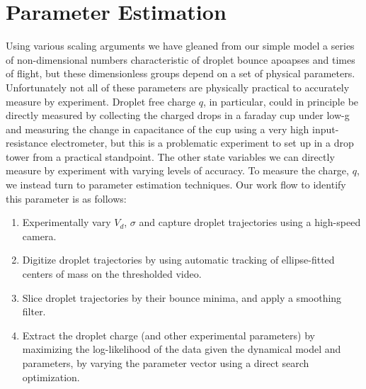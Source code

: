 \documentclass[12pt,a4paper,oneside]{book}
\begin{document}
\section{Parameter Estimation}
Using various scaling arguments we have gleaned from our simple model a series of non-dimensional numbers characteristic of droplet bounce apoapses and times of flight, but these dimensionless groups depend on a set of physical parameters. Unfortunately not all of these parameters are physically practical to accurately measure by experiment. Droplet free charge $q$, in particular, could in principle be directly measured by collecting the charged drops in a faraday cup under low-g and measuring the change in capacitance of the cup using a very high input-resistance electrometer, but this is a problematic experiment to set up in a drop tower from a practical standpoint. The other state variables we can directly measure by experiment with varying levels of accuracy. To measure the charge, $q$, we instead turn to parameter estimation techniques. Our work flow to identify this parameter is as follows:
\begin{enumerate}
\item Experimentally vary $V_d$, $\sigma$ and capture droplet trajectories using a high-speed camera.
\item Digitize droplet trajectories by using automatic tracking of ellipse-fitted centers of mass on the thresholded video.
\item Slice droplet trajectories by their bounce minima, and apply a smoothing filter.
\item Extract the droplet charge (and other experimental parameters) by maximizing the log-likelihood of the data given the dynamical model and parameters, by varying the parameter vector using a direct search optimization. 
\end{enumerate}
\end{document}
